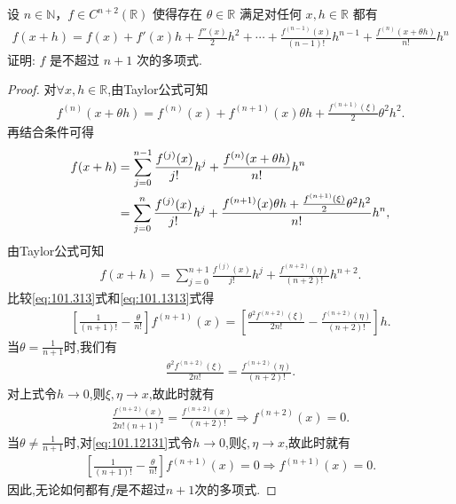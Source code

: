 \documentclass[../../main.tex]{subfiles}
\begin{document}
\begin{example}
设 \( n \in \mathbb{N} \)，\( f \in C^{n+2}(\mathbb{R}) \) 使得存在 \( \theta \in \mathbb{R} \) 满足对任何 \( x, h \in \mathbb{R} \) 都有
\begin{align*}
f(x + h) = f(x) + f'(x)h + \frac{f''(x)}{2}h^2 + \cdots + \frac{f^{(n-1)}(x)}{(n-1)!}h^{n-1} + \frac{f^{(n)}(x + \theta h)}{n!}h^n
\end{align*}
证明: \( f \) 是不超过 \( n + 1 \) 次的多项式.
\end{example}
\begin{proof}
对$\forall x,h\in \mathbb{R}$,由Taylor公式可知
\begin{align*}
f^{(n)}(x+\theta h) =f^{(n)}(x) +f^{(n+1)}(x) \theta h+\frac{f^{(n+1)}(\xi)}{2}\theta^2 h^2.
\end{align*}
再结合条件可得
\begin{align}
f(x+h) &=\sum_{j=0}^{n-1}\frac{f^{(j)}(x)}{j!}h^j+\frac{f^{(n)}(x+\theta h)}{n!}h^n \notag \\
&=\sum_{j=0}^n\frac{f^{(j)}(x)}{j!}h^j+\frac{f^{(n+1)}(x) \theta h+\frac{f^{(n+1)}(\xi)}{2}\theta^2 h^2}{n!}h^n, \label{eq:101.313}
\end{align}
由Taylor公式可知
\begin{align}
f(x+h) =\sum_{j=0}^{n+1}\frac{f^{(j)}(x)}{j!}h^j+\frac{f^{(n+2)}(\eta)}{(n+2)!}h^{n+2}. \label{eq:101.1313}
\end{align}
比较\eqref{eq:101.313}式和\eqref{eq:101.1313}式得
\begin{align}
\left[ \frac{1}{(n+1)!}-\frac{\theta}{n!} \right] f^{(n+1)}(x) =\left[ \frac{\theta^2 f^{(n+2)}(\xi)}{2n!}-\frac{f^{(n+2)}(\eta)}{(n+2)!} \right] h. \label{eq:101.12131}
\end{align}
当$\theta =\frac{1}{n+1}$时,我们有
\begin{align*}
\frac{\theta^2 f^{(n+2)}(\xi)}{2n!}=\frac{f^{(n+2)}(\eta)}{(n+2)!}.
\end{align*}
对上式令$h\rightarrow 0$,则$\xi,\eta \rightarrow x$,故此时就有
\begin{align*}
\frac{f^{(n+2)}(x)}{2n!(n+1)^2}=\frac{f^{(n+2)}(x)}{(n+2)!}\Rightarrow f^{(n+2)}(x) =0.
\end{align*}
当$\theta \ne \frac{1}{n+1}$时,对\eqref{eq:101.12131}式令$h\rightarrow 0$,则$\xi,\eta \rightarrow x$,故此时就有
\begin{align*}
\left[ \frac{1}{(n+1)!}-\frac{\theta}{n!} \right] f^{(n+1)}(x) =0\Rightarrow f^{(n+1)}(x) =0.
\end{align*}
因此,无论如何都有$f$是不超过$n+1$次的多项式.

\end{proof}
\end{document}
